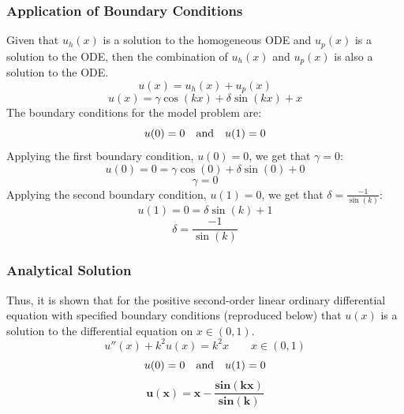 \documentclass[10pt]{article}		%
\numberwithin{equation}{section}
\begin{document}
\subsubsection{Application of Boundary Conditions}

Given that $u_h(x)$ is a solution to the homogeneous ODE and $u_p(x)$ is a solution to the ODE, then the combination of $u_h(x)$ and $u_p(x)$ is also a solution to the ODE.
\begin{equation}
u(x) = u_h(x) + u_p(x)
\end{equation}
\begin{equation}
u(x) = \gamma \cos(kx) + \delta \sin(kx) + x
\end{equation}
The boundary conditions for the model problem are:
\begin{equation}
u(0) = 0 \quad \textnormal{and} \quad u(1) = 0 
\end{equation}
Applying the first boundary condition, $u(0) = 0$, we get that $\gamma = 0$:
\begin{equation}
u(0) = 0 = \gamma \cos(0) + \delta \sin(0) + 0
\end{equation}
\begin{equation}
\gamma = 0
\end{equation}
Applying the second boundary condition, $u(1) = 0$, we get that $\delta = \frac{-1}{\sin(k)}$:
\begin{equation}
u(1) = 0 = \delta \sin(k) + 1
\end{equation}
\begin{equation}
\delta = \frac{-1}{\sin(k)}
\end{equation}

\subsubsection{Analytical Solution}

Thus, it is shown that for the positive second-order linear ordinary differential equation with specified boundary conditions (reproduced below) that $u(x)$ is a solution to the differential equation on $x \in (0, 1)$.
\begin{equation}
u''(x)+k^2u(x)=k^2x \qquad x \in (0, 1)
\end{equation}
\begin{equation}
u(0) = 0 \quad \textnormal{and} \quad u(1) = 0 
\end{equation}
\begin{equation}
\mathbf{u(x) = x - \frac{sin(kx)}{sin(k)}}
\end{equation}
\end{document}
